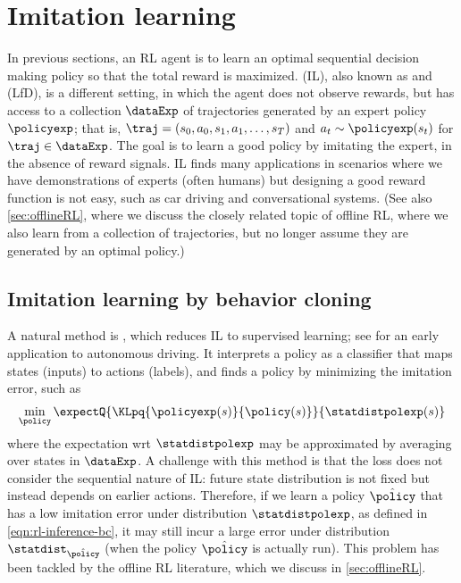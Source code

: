 




\section{Imitation learning}
\label{sec:imitation}

In previous sections, an RL agent is
to learn an optimal sequential decision making policy
so that the total reward is maximized.
 (IL),
also known as 
and  (LfD),
is a different setting,
in which the agent does not observe rewards,
but has access to a collection $\dataExp$ of trajectories
generated by an expert policy $\policyexp$;
that is, $\traj = (s_0,a_0,s_1,a_1,\ldots,s_T)$
and $a_t \sim \policyexp(s_t)$
for $\traj\in\dataExp$.
The goal is to learn a good policy by imitating the expert,
in the absence of reward signals.
IL finds many applications in scenarios
where we have demonstrations of experts (often humans)
but designing a good reward function is not easy,
such as car driving and conversational systems.
(See also \cref{sec:offlineRL}, where we discuss the closely
related topic of offline RL, where we also learn from a collection
of trajectories, but no longer assume they are generated by an optimal
policy.)

\subsection{Imitation learning by behavior cloning}
\label{sec:behavior-cloning}
\label{sec:BC}

A natural method is ,
which reduces IL to supervised learning;
see \citep{Pomerleau89} for an early application
to autonomous driving.
It interprets a policy as a classifier that
maps states (inputs) to actions (labels),
and finds a policy
by minimizing the imitation error, such as
\begin{align}
\label{eqn:rl-inference-bc}
\min_{\policy}
\expectQ{\KLpq{\policyexp(s)}{\policy(s)}}{\statdistpolexp(s)}
\end{align}
where the expectation wrt $\statdistpolexp$ may be approximated by averaging over states in $\dataExp$.
A challenge with this method is that the loss
does not consider the sequential nature of IL:
future state distribution is not fixed
but instead depends on earlier actions.
Therefore, if we learn a policy $\hat{\policy}$ that
has a low imitation error under distribution
$\statdistpolexp$,
as defined in \cref{eqn:rl-inference-bc},
it may still incur a large error
under distribution $\statdist_{\hat{\policy}}$
(when the policy $\hat{\policy}$ is actually run).
This problem has been tackled by the offline RL
literature, which we discuss in \cref{sec:offlineRL}.

